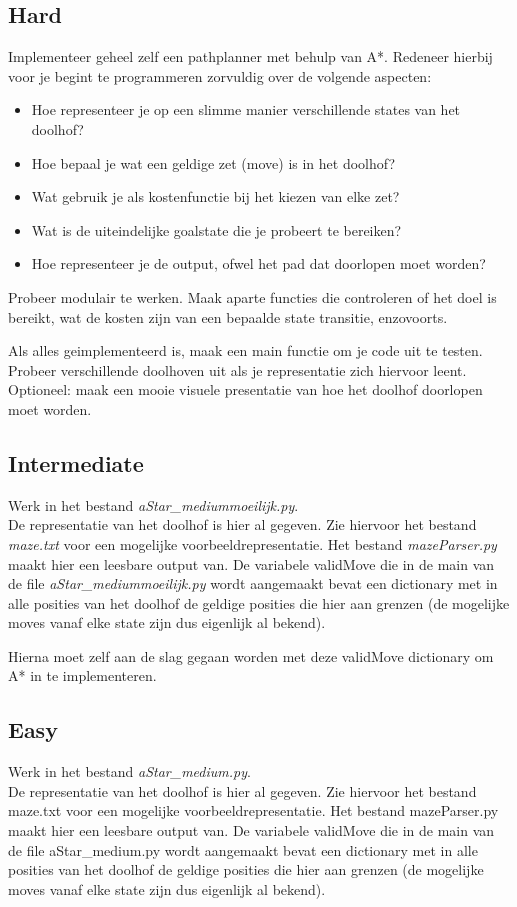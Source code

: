 \documentclass[a4paper]{article}
\begin{document}
\subsection{Hard}
Implementeer geheel zelf een pathplanner met behulp van A*. Redeneer hierbij voor je begint te programmeren zorvuldig over de volgende aspecten:
\begin{itemize}
\item Hoe representeer je op een slimme manier verschillende states van het doolhof?
\item Hoe bepaal je wat een geldige zet (move) is in het doolhof?
\item Wat gebruik je als kostenfunctie bij het kiezen van elke zet?
\item Wat is de uiteindelijke goalstate die je probeert te bereiken?
\item Hoe representeer je de output, ofwel het pad dat doorlopen moet worden?
\end{itemize}

Probeer modulair te werken. Maak aparte functies die controleren of het doel is bereikt, wat de kosten
zijn van een bepaalde state transitie, enzovoorts.

Als alles geimplementeerd is, maak een main functie om je code uit te testen. Probeer verschillende doolhoven uit als je representatie zich hiervoor leent.\\
Optioneel: maak een mooie visuele presentatie van hoe het doolhof doorlopen moet worden.


\subsection{Intermediate}
Werk in het bestand \textit{aStar\_mediummoeilijk.py}.\\
De representatie van het doolhof is hier al gegeven. Zie hiervoor het bestand \textit{maze.txt} voor een mogelijke voorbeeldrepresentatie. Het bestand \textit{mazeParser.py} maakt hier een leesbare output van. De variabele validMove die in de main van de file \textit{aStar\_mediummoeilijk.py} wordt aangemaakt bevat een dictionary met in alle posities van het doolhof de geldige posities die hier aan grenzen (de mogelijke moves vanaf elke state zijn dus eigenlijk al bekend).

Hierna moet zelf aan de slag gegaan worden met deze validMove dictionary om A* in te implementeren. 

\subsection{Easy}
Werk in het bestand \textit{aStar\_medium.py}.\\
De representatie van het doolhof is hier al gegeven. Zie hiervoor het bestand maze.txt voor een mogelijke voorbeeldrepresentatie. 
Het bestand mazeParser.py maakt hier een leesbare output van. De variabele validMove die in de main van de file aStar\_medium.py wordt aangemaakt bevat een dictionary met in alle posities van het doolhof de geldige posities die hier aan grenzen (de
mogelijke moves vanaf elke state zijn dus eigenlijk al bekend).
\end{document}
